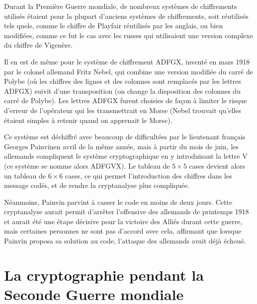 Durant la Première Guerre mondiale, de nombreux systèmes de
chiffrements utilisés étaient pour la plupart d'anciens systèmes de
chiffrements, soit réutilisés tels quels, comme le chiffre de Playfair
réutilisés par les anglais, ou bien modifiées, comme ce fut le cas
avec les russes qui utilisaient une version complexe du chiffre de
Vigenère.

Il en est de même pour le système de chiffrement ADFGX, inventé en
mars 1918 par le colonel allemand Fritz %
Nebel, qui combine une version modifiée
du carré de Polybe (où les chiffres des
lignes et des colonnes sont remplacés par les lettres ADFGX) suivit d'une
transposition (on change la disposition
des colonnes du carré de Polybe). Les lettres ADFGX furent choisies de
façon à limiter le risque d'erreur de l'opérateur qui les
transmettrait en Morse (Nebel trouvait qu'elles étaient simples à
retenir quand on apprenait le Morse).

Ce système est déchiffré avec beaucoup de difficultées par le
lieutenant français Georges Painvinen avril de la même année, mais à
partir du mois de juin, les allemands compliquent le système
cryptographique en y introduisant la lettre V (ce système se nomme
alors ADFGVX). Le tableau de $5\times 5$ cases devient alors un tableau
de $6\times 6$ cases, ce qui permet l'introduction des chiffres dans
les message codés, et de rendre la cryptanalyse plus
compliquée.

Néanmoins, Painvin parvint à casser le code en moins de
deux jours. Cette cryptanalyse aurait permit d'arrêter l'offensive
des allemands de printemps 1918 et aurait été une étape décisive pour
la victoire des Alliés durant cette guerre, mais certaines personnes
ne sont pas d'accord avec cela, affirmant que lorsque Painvin proposa
sa solution au code, l'attaque des allemands avait déjà échoué. 
\section{La cryptographie pendant la Seconde Guerre mondiale}
